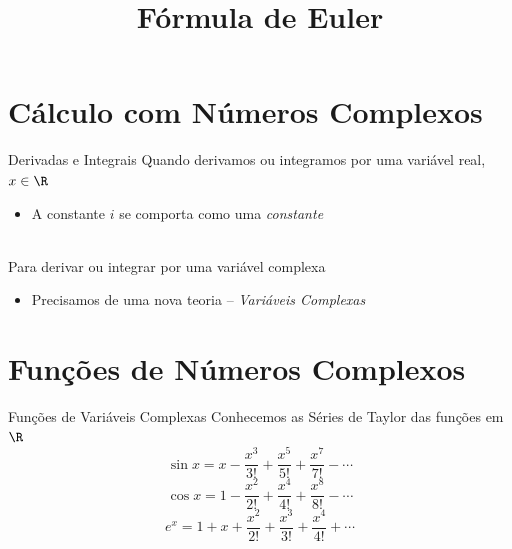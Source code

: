 
\usepackage{calculo_varias_variaveis-1}

\title {Fórmula de Euler}



\addtitle

\section{Cálculo com Números Complexos}

\begin{frame}{Derivadas e Integrais}
  Quando derivamos ou integramos por uma variável real, $x\in\R$
  \pause
  \begin{itemize}
    \item A constante \emph{\(i\)} se comporta como uma \emph{constante}
  \end{itemize}~\\

  \pause
  Para derivar ou integrar por uma variável complexa
  \pause
  \begin{itemize}
    \item Precisamos de uma nova teoria
    \pause
    --\emph{ Variáveis Complexas}
  \end{itemize}
\end{frame}


\section{Funções de Números Complexos}

\begin{frame}{Funções de Variáveis Complexas}
  Conhecemos as Séries de Taylor das funções em $\R$
  \pause
  \[
    \sin x = x - \frac{x^3}{3!} + \frac{x^5}{5!} + \frac{x^7}{7!} - \cdots
  \]
  \pause
  \[
    \cos x = 1 - \frac{x^2}{2!} + \frac{x^4}{4!} + \frac{x^8}{8!} - \cdots
  \]
  \pause
  \[
    e^x = 1 + x + \frac{x^2}{2!} + \frac{x^3}{3!} + \frac{x^4}{4!} +  \cdots
  \]
\end{frame}

